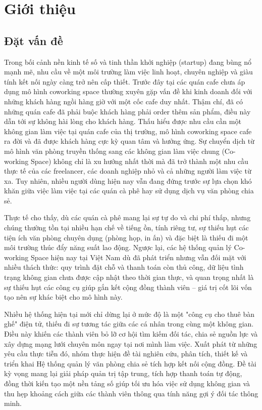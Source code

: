 \section{Giới thiệu}
\subsection{Đặt vấn đề}

Trong bối cảnh nền kinh tế số và tinh thần khởi nghiệp (startup) đang bùng nổ mạnh mẽ, nhu cầu về một môi trường làm việc linh hoạt, chuyên nghiệp và giàu tính kết nối ngày càng trở nên cấp thiết. Trước đây tại các quán cafe chưa áp dụng mô hình coworking space thường xuyên gặp vấn đề khi kinh doanh đối với những khách hàng ngồi hàng giờ với một cốc cafe duy nhất. Thậm chí, đã có những quán cafe đã phải buộc khách hàng phải order thêm sản phẩm, điều này dẫn tới sự không hài lòng cho khách hàng. Thấu hiểu được nhu cầu cần một không gian làm việc tại quán cafe của thị trường, mô hình coworking space cafe ra đời và đã được khách hàng cực kỳ quan tâm và hưởng ứng. Sự chuyển dịch từ mô hình văn phòng truyền thống sang các không gian làm việc chung (Co-working Space) không chỉ là xu hướng nhất thời mà đã trở thành một nhu cầu thực tế của các freelancer, các doanh nghiệp nhỏ và cả những người làm việc từ xa. Tuy nhiên, nhiều người dùng hiện nay vẫn đang đứng trước sự lựa chọn khó khăn giữa việc làm việc tại các quán cà phê hay sử dụng dịch vụ văn phòng chia sẻ.

Thực tế cho thấy, dù các quán cà phê mang lại sự tự do và chi phí thấp, nhưng chúng thường tồn tại nhiều hạn chế về tiếng ồn, tính riêng tư, sự thiếu hụt các tiện ích văn phòng chuyên dụng (phòng họp, in ấn) và đặc biệt là thiếu đi một môi trường thúc đẩy năng suất lao động. Ngược lại, các hệ thống quản lý Co-working Space hiện nay tại Việt Nam dù đã phát triển nhưng vẫn đối mặt với nhiều thách thức: quy trình đặt chỗ và thanh toán còn thủ công, dữ liệu tình trạng không gian chưa được cập nhật theo thời gian thực, và quan trọng nhất là sự thiếu hụt các công cụ giúp gắn kết cộng đồng thành viên – giá trị cốt lõi vốn tạo nên sự khác biệt cho mô hình này.

Nhiều hệ thống hiện tại mới chỉ dừng lại ở mức độ là một "công cụ cho thuê bàn ghế" điện tử, thiếu đi sự tương tác giữa các cá nhân trong cùng một không gian. Điều này khiến các thành viên bỏ lỡ cơ hội tìm kiếm đối tác, chia sẻ nguồn lực và xây dựng mạng lưới chuyên môn ngay tại nơi mình làm việc. Xuất phát từ những yêu cầu thực tiễn đó, nhóm thực hiện đề tài nghiên cứu, phân tích, thiết kế và triển khai Hệ thống quản lý văn phòng chia sẻ tích hợp kết nối cộng đồng. Đề tài kỳ vọng mang lại giải pháp quản trị tập trung, tích hợp thanh toán tự động, đồng thời kiến tạo một nền tảng số giúp tối ưu hóa việc sử dụng không gian và thu hẹp khoảng cách giữa các thành viên thông qua tính năng gợi ý đối tác thông minh.

